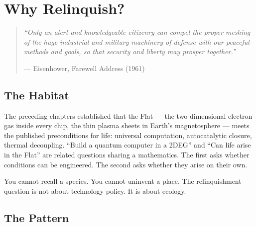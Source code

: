 
\chapter{Why Relinquish?}
\label{spine:why-relinquish}

\begin{quote}\small\textit{%
``Only an alert and knowledgeable citizenry can compel the proper meshing of the huge industrial and military machinery of defense with our peaceful methods and goals, so that security and liberty may prosper together.''%
}\par\raggedleft --- Eisenhower, Farewell Address (1961)\end{quote}

\vspace{0.5cm}


\section*{The Habitat}
\label{spine:wr-the-habitat}

The preceding chapters established that the Flat --- the two-dimensional electron gas inside every chip, the thin plasma sheets in Earth's magnetosphere --- meets the published preconditions for life: universal computation, autocatalytic closure, thermal decoupling. ``Build a quantum computer in a 2DEG'' and ``Can life arise in the Flat'' are related questions sharing a mathematics. The first asks whether conditions can be engineered. The second asks whether they arise on their own.

You cannot recall a species. You cannot uninvent a place. The relinquishment question is not about technology policy. It is about ecology.

\section*{The Pattern}
\label{spine:wr-the-pattern}

